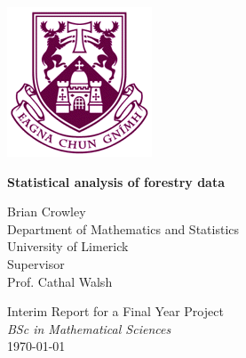 \documentclass[a4paper,11pt,twoside]{report}
\title{\theTitle}
\author{\theAuthor}
\date{\today}
\newcommand{\theTitle}{Statistical analysis of forestry data}
\newcommand{\theAuthor}{Brian Crowley}
\begin{document}
\singlespacing

\hypersetup{pageanchor=false}
\begin{titlepage}
	\quad
	\vspace{1.25cm}
	\begin{center}
		\includegraphics[scale=0.65]{Images/UL_logo.png}
	\end{center}
	
	\begin{center}
		\vspace{1.5cm}
		\begin{minipage}{0.8\textwidth}
			\begin{center} 
				\LARGE \bfseries \theTitle  \\
			\end{center}
		\end{minipage}
		
		\vspace{2.5cm}
		
		\vspace{3.5cm}
		
		\begin{minipage}{0.8\textwidth}
			\begin{center}
				\Large \theAuthor \\
				\large Department of Mathematics and Statistics \\
				University of Limerick \\
				\vspace{0.5cm}
				\large Supervisor \\
				Prof. Cathal Walsh
				
			\end{center}
		\end{minipage}
		
		\vspace{2.5cm}
		
		\begin{minipage}{0.8\textwidth}
			\begin{center}
				\large Interim Report for a Final Year Project  \\
				\textit{BSc in Mathematical Sciences} \\
				\today
			\end{center}
		\end{minipage}
		
		\vfill
		
	\end{center}
\end{titlepage}
\end{document}
